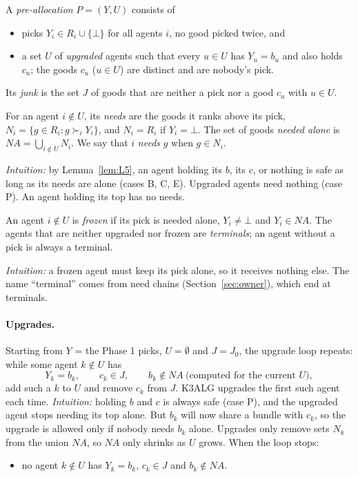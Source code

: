 \documentclass[runningheads,11pt]{llncs}
\newcommand{\NA}{\mathit{NA}}
\newcommand{\none}{\bot}
\newcommand{\st}{\mathrel{:}}
\begin{document}
\begin{definition}\label{def:prealloc}
A \emph{pre-allocation} $P=(Y,U)$ consists of
\begin{itemize}
\item picks $Y_i\in R_i\cup\{\none\}$ for all agents $i$, no good picked twice, and
\item a set $U$ of \emph{upgraded} agents such that every $u\in U$ has $Y_u=b_u$ and also holds $c_u$; the goods $c_u$ ($u\in U$) are distinct and are nobody's pick.
\end{itemize}
Its \emph{junk} is the set $J$ of goods that are neither a pick nor a good $c_u$ with $u\in U$.
\end{definition}

\begin{definition}[needs]\label{def:needs}
For an agent $i\notin U$, its \emph{needs} are the goods it ranks above its pick, $N_i=\{g\in R_i\st g\succ_i Y_i\}$, and $N_i=R_i$ if $Y_i=\none$. The set of goods \emph{needed alone} is $\NA=\bigcup_{i\notin U}N_i$. We say that $i$ \emph{needs} $g$ when $g\in N_i$.
\end{definition}

\noindent \emph{Intuition:} by Lemma~\ref{lem:L5}, an agent holding its $b$, its $c$, or nothing is safe as long as its needs are alone (cases B, C, E). Upgraded agents need nothing (case P). An agent holding its top has no needs.

\begin{definition}\label{def:frozen}
An agent $i\notin U$ is \emph{frozen} if its pick is needed alone, $Y_i\ne\none$ and $Y_i\in\NA$. The agents that are neither upgraded nor frozen are \emph{terminals}; an agent without a pick is always a terminal.
\end{definition}

\noindent \emph{Intuition:} a frozen agent must keep its pick alone, so it receives nothing else. The name ``terminal'' comes from need chains (Section~\ref{sec:owner}), which end at terminals.

\paragraph{Upgrades.} Starting from $Y$ = the Phase 1 picks, $U=\emptyset$ and $J=J_0$, the upgrade loop repeats: while some agent $k\notin U$ has
\[
  Y_k=b_k,\qquad c_k\in J,\qquad b_k\notin\NA\ \text{(computed for the current $U$)},
\]
add such a $k$ to $U$ and remove $c_k$ from $J$. K3ALG upgrades the first such agent each time. \emph{Intuition:} holding $b$ and $c$ is always safe (case P), and the upgraded agent stops needing its top alone. But $b_k$ will now share a bundle with $c_k$, so the upgrade is allowed only if nobody needs $b_k$ alone. Upgrades only remove sets $N_k$ from the union $\NA$, so $\NA$ only shrinks as $U$ grows. When the loop stops:
\begin{itemize}
\item[(UT)] no agent $k\notin U$ has $Y_k=b_k$, $c_k\in J$ and $b_k\notin\NA$.
\end{itemize}
\end{document}
